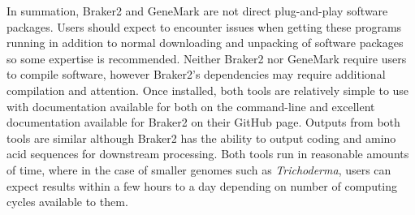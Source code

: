 In summation, Braker2 and GeneMark are not direct plug-and-play
software packages. Users should expect to encounter issues when
getting these programs running in addition to normal downloading and
unpacking of software packages so some expertise is
recommended. Neither Braker2 nor GeneMark require users to compile
software, however Braker2's dependencies may require additional
compilation and attention. Once installed, both tools are relatively
simple to use with documentation available for both on the command-line
and excellent documentation available for Braker2 on their GitHub
page. Outputs from both tools are similar although Braker2 has the
ability to output coding and amino acid sequences for downstream
processing. Both tools run in reasonable amounts of time, where in the
case of smaller genomes such as \textit{Trichoderma}, users can expect
results within a few hours to a day depending on number of computing
cycles available to them.
